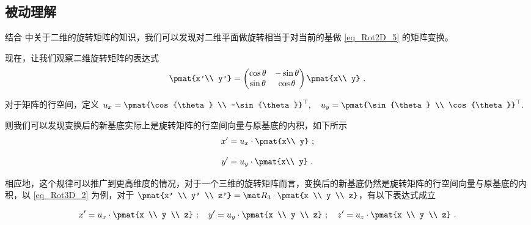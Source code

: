\subsection{被动理解}

结合  中关于二维的旋转矩阵的知识，我们可以发现对二维平面做旋转相当于对当前的基做 \autoref{eq_Rot2D_5} 的矩阵变换。

现在，让我们观察二维旋转矩阵的表达式
\begin{equation}
\pmat{x'\\ y'} =
\begin{pmatrix}
\cos\theta & - \sin\theta\\
\sin\theta &\cos\theta
\end{pmatrix}\pmat{x\\ y}~.
\end{equation}

对于矩阵的行空间，定义 $u_{x}=\pmat{\cos{\theta} \\ -\sin{\theta}}^{\top} ,\quad u_{y}=\pmat{\sin{\theta} \\ \cos{\theta}}^{\top}.$

则我们可以发现变换后的新基底实际上是旋转矩阵的行空间向量与原基底的内积，如下所示
\begin{equation}
x' = u_{x} \cdot \pmat{x\\ y} ~;
\end{equation}

\begin{equation}
y' = u_{y} \cdot \pmat{x\\ y} ~.
\end{equation}

相应地，这个规律可以推广到更高维度的情况，对于一个三维的旋转矩阵而言，变换后的新基底仍然是旋转矩阵的行空间向量与原基底的内积，以 \autoref{eq_Rot3D_2} 为例，对于 $\pmat{x' \\ y' \\ z'} = \mat R_3 \cdot \pmat{x \\ y \\ z}$，有以下表达式成立

\begin{equation}\label{eq_Rot3D_3}
x' = u_{x} \cdot \pmat{x \\ y \\ z} ~; \quad
y' = u_{y} \cdot \pmat{x \\ y \\ z} ~; \quad
z' = u_{z} \cdot \pmat{x \\ y \\ z} ~.
\end{equation}

